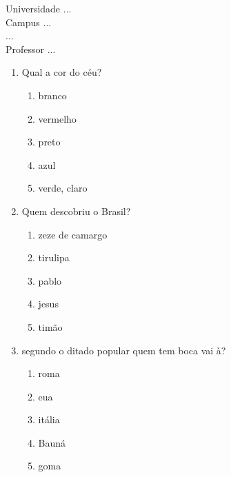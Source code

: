 \documentclass[10pt,a4paper,twocolumn]{report}
\begin{document}
\begin{flushleft}
Universidade ...\\
Campus ...\\
...\\
Professor ...\\
\end{flushleft}




 \begin{enumerate} 
    \item  Qual a cor do céu?





    \begin{enumerate}
    \item  branco

\item  vermelho

\item  preto

\item  azul

\item  verde, claro


    \end{enumerate} 
    \item  Quem descobriu o Brasil?





    \begin{enumerate}
    \item  zeze de camargo

\item  tirulipa

\item  pablo

\item  jesus

\item  timão


    \end{enumerate} 
    \item  segundo o ditado popular quem tem boca vai à?





    \begin{enumerate}
    \item  roma

\item  eua

\item  itália

\item  Bauná

\item  goma


    \end{enumerate}\end{enumerate} 
\end{document}

